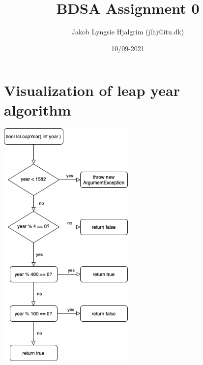 \documentclass{article}
\title{BDSA Assignment 0}
\author{Jakob Lyngsie Hjalgrim (jlhj@itu.dk)}
\date{10/09-2021}
\begin{document}
\maketitle

\section{Visualization of leap year algorithm}
\includegraphics[width=0.5\textwidth]{leapyear_flowchart.png}
\end{document}
